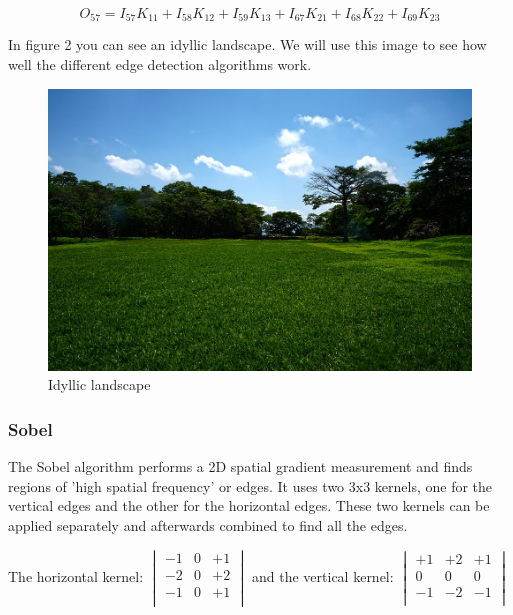 \documentclass[12pt]{article}
\begin{document}
\begin{equation}
O_{57} = I_{57}K_{11} + I_{58}K_{12} + I_{59}K_{13} + I_{67}K_{21} + I_{68}K_{22} + I_{69}K_{23}
\end{equation}
\newpage

In figure 2 you can see an idyllic landscape. We will use this image to see how well the different edge detection algorithms work.

\begin{figure}[h]
\centering
\includegraphics[scale = 0.3]{img/landscape}
\caption{Idyllic landscape}
\end{figure}

\subsubsection{Sobel}

 The Sobel algorithm performs a 2D spatial gradient measurement and finds regions of 'high spatial frequency' or edges. It uses two 3x3 kernels, one for the vertical edges and the other for the horizontal edges. These two kernels can be applied separately and afterwards combined to find all the edges.
 \newline

 The horizontal kernel: 
 $\begin{vmatrix}
        -1 & 0 & +1\\
        -2 & 0 & +2\\
        -1 & 0 & +1\\
\end{vmatrix}$
and the vertical kernel:
$\begin{vmatrix}
        +1 & +2 & +1\\
        0 & 0 & 0\\
        -1 & -2 & -1\\
\end{vmatrix}$
\end{document}
